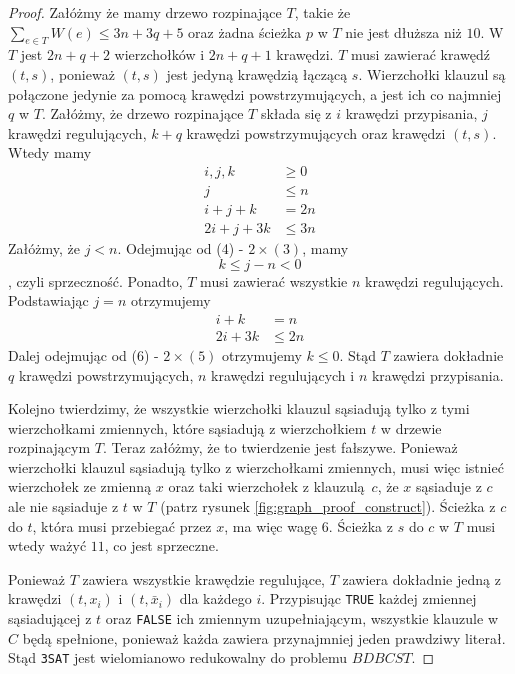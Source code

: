 \begin{theorem}
\begin{proof}
        Załóżmy że mamy drzewo rozpinające $T$, takie że $\sum_{e\in T} W(e) \leq 3n +3q + 5$ oraz żadna ścieżka $p$ w $T$ nie jest dłuższa niż $10$. W $T$ jest $2n + q + 2$ wierzchołków i $2n + q + 1$ krawędzi. $T$ musi zawierać krawędź $(t, s)$, ponieważ $(t, s)$ jest jedyną krawędzią łączącą $s$. Wierzchołki klauzul są połączone jedynie za pomocą krawędzi powstrzymujących, a jest ich co najmniej $q$ w $T$. Załóżmy, że drzewo rozpinające $T$ składa się z $i$ krawędzi przypisania, $j$ krawędzi regulujących, $k + q$ krawędzi powstrzymujących oraz krawędzi $(t, s)$. Wtedy mamy
        \begin{align}
            i, j, k     &\geq 0 \\
            j           &\leq n \\
            i + j + k   &= 2n \\
            2i + j + 3k &\leq 3n 
        \end{align}
        Załóżmy, że $j < n$. Odejmując od (4) - $2\times (3)$, mamy $$k \leq j-n < 0$$, czyli sprzeczność. Ponadto, $T$ musi zawierać wszystkie $n$ krawędzi regulujących. Podstawiając $j = n$ otrzymujemy
        \begin{align}
            i + k   &= n \\
            2i + 3k &\leq 2n
        \end{align}
        Dalej odejmując od (6) - $2\times (5)$ otrzymujemy $k \leq 0$. Stąd $T$ zawiera dokładnie $q$ krawędzi powstrzymujących, $n$ krawędzi regulujących i $n$ krawędzi przypisania.

        Kolejno twierdzimy, że wszystkie wierzchołki klauzul sąsiadują tylko z tymi wierzchołkami zmiennych, które sąsiadują z wierzchołkiem $t$ w drzewie rozpinającym $T$. Teraz załóżmy, że to twierdzenie jest fałszywe. Ponieważ wierzchołki klauzul sąsiadują tylko z wierzchołkami zmiennych, musi więc istnieć wierzchołek ze zmienną $x$ oraz taki wierzchołek z klauzulą $c$, że $x$ sąsiaduje z $c$ ale nie sąsiaduje z $t$ w $T$ (patrz rysunek \ref{fig:graph_proof_construct}). Ścieżka z $c$ do $t$, która musi przebiegać przez $x$, ma więc wagę $6$. Ścieżka z $s$ do $c$ w $T$ musi wtedy ważyć $11$, co jest sprzeczne.

        Ponieważ $T$ zawiera wszystkie krawędzie regulujące, $T$ zawiera dokładnie jedną z krawędzi $(t, x_i)$ i $(t, \bar{x}_i)$ dla każdego $i$. Przypisując \texttt{TRUE} każdej zmiennej sąsiadującej z $t$ oraz \texttt{FALSE} ich zmiennym uzupełniającym, wszystkie klauzule w $C$ będą spełnione, ponieważ każda zawiera przynajmniej jeden prawdziwy literał. Stąd \texttt{3SAT} jest wielomianowo redukowalny do problemu $BDBCST$. 
    \end{proof}
\end{theorem}

